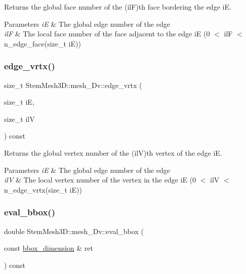 Returns the global face number of the (ilF)\textquotesingle{}th face bordering the edge iE. 


\begin{DoxyParams}{Parameters}
{\em iE} & The global edge number of the edge \\
\hline
{\em ilF} & The local face number of the face adjacent to the edge iE (0 $<$ ilF $<$ n\+\_\+edge\+\_\+face(size\+\_\+t i\+E)) \\
\hline
\end{DoxyParams}
\mbox{\label{classStemMesh3D_1_1mesh__3Dv_a7024d4e9bd97ff05c7926c9b4a97be62}} 
\subsubsection{\texorpdfstring{edge\+\_\+vrtx()}{edge\_vrtx()}}
{\footnotesize\ttfamily size\+\_\+t Stem\+Mesh3\+D\+::mesh\+\_\+Dv\+::edge\+\_\+vrtx (\begin{DoxyParamCaption}\item[{size\+\_\+t}]{iE,  }\item[{size\+\_\+t}]{ilV }\end{DoxyParamCaption}) const}



Returns the global vertex number of the (ilV)\textquotesingle{}th vertex of the edge iE. 


\begin{DoxyParams}{Parameters}
{\em iE} & The global edge number of the edge \\
\hline
{\em ilV} & The local vertex number of the vertex in the edge iE (0 $<$ ilV $<$ n\+\_\+edge\+\_\+vrtx(size\+\_\+t i\+E)) \\
\hline
\end{DoxyParams}
\mbox{\label{classStemMesh3D_1_1mesh__3Dv_a4f4fbb68bc50a56fab817fa3ddaf33c2}} 
\subsubsection{\texorpdfstring{eval\+\_\+bbox()}{eval\_bbox()}}
{\footnotesize\ttfamily double Stem\+Mesh3\+D\+::mesh\+\_\+Dv\+::eval\+\_\+bbox (\begin{DoxyParamCaption}\item[{const \hyperlink{classStemMesh3D_1_1mesh__3Dv_a550002922df52cb0711f6d0da2398d6b}{bbox\+\_\+dimension} \&}]{ret }\end{DoxyParamCaption}) const\hspace{0.3cm}{\ttfamily [inline]}}



